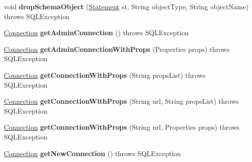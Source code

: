 \begin{DoxyCompactItemize}
void {\bfseries drop\+Schema\+Object} (\mbox{\hyperlink{interfacecom_1_1mysql_1_1jdbc_1_1_statement}{Statement}} st, String object\+Type, String object\+Name)  throws S\+Q\+L\+Exception 
\item 
\mbox{\label{classtestsuite_1_1_base_test_case_a5aac2df8b2b635a640bd2ca0f9df4f63}} 
\mbox{\hyperlink{interfacecom_1_1mysql_1_1jdbc_1_1_connection}{Connection}} {\bfseries get\+Admin\+Connection} ()  throws S\+Q\+L\+Exception 
\item 
\mbox{\label{classtestsuite_1_1_base_test_case_a1b9097dbfa04cb3fda0be74767ee8b02}} 
\mbox{\hyperlink{interfacecom_1_1mysql_1_1jdbc_1_1_connection}{Connection}} {\bfseries get\+Admin\+Connection\+With\+Props} (Properties props)  throws S\+Q\+L\+Exception 
\item 
\mbox{\label{classtestsuite_1_1_base_test_case_a7a043249373f91474cb8dbfad42ea105}} 
\mbox{\hyperlink{interfacecom_1_1mysql_1_1jdbc_1_1_connection}{Connection}} {\bfseries get\+Connection\+With\+Props} (String props\+List)  throws S\+Q\+L\+Exception 
\item 
\mbox{\label{classtestsuite_1_1_base_test_case_a6d4d784759272e95598bed255fe533fa}} 
\mbox{\hyperlink{interfacecom_1_1mysql_1_1jdbc_1_1_connection}{Connection}} {\bfseries get\+Connection\+With\+Props} (String url, String props\+List)  throws S\+Q\+L\+Exception 
\item 
\mbox{\label{classtestsuite_1_1_base_test_case_a63736613e1c2617aa290baa6ecadaf1b}} 
\mbox{\hyperlink{interfacecom_1_1mysql_1_1jdbc_1_1_connection}{Connection}} {\bfseries get\+Connection\+With\+Props} (String url, Properties props)  throws S\+Q\+L\+Exception 
\item 
\mbox{\label{classtestsuite_1_1_base_test_case_af4fbedf355c4e4adc888e5acb709694f}} 
\mbox{\hyperlink{interfacecom_1_1mysql_1_1jdbc_1_1_connection}{Connection}} {\bfseries get\+New\+Connection} ()  throws S\+Q\+L\+Exception 
\item 
\mbox{\label{classtestsuite_1_1_base_test_case_af0bcfb0a02343c87cca38ff29fae2f4d}} 

\end{DoxyCompactItemize}
